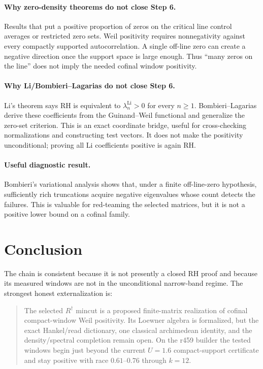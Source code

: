 \documentclass[11pt]{article}
\newcommand{\Rd}{R^{\dagger}}
\begin{document}
\paragraph{Why zero-density theorems do not close Step 6.}
Results that put a positive proportion of zeros on the critical
line control averages or restricted zero sets.  Weil positivity
requires nonnegativity against every compactly supported
autocorrelation.  A single off-line zero can create a negative
direction once the support space is large enough.  Thus
``many zeros on the line'' does not imply the needed cofinal
window positivity.

\paragraph{Why Li/Bombieri--Lagarias do not close Step 6.}
Li's theorem says RH is equivalent to
$\lambda_n^{\mathrm{Li}}>0$ for every $n\ge1$.
Bombieri--Lagarias derive these coefficients from the
Guinand--Weil functional and generalize the zero-set criterion.
This is an exact coordinate bridge, useful for cross-checking
normalizations and constructing test vectors.  It does not make
the positivity unconditional; proving all Li coefficients
positive is again RH.

\paragraph{Useful diagnostic result.}
Bombieri's variational analysis shows that, under a finite
off-line-zero hypothesis, sufficiently rich truncations acquire
negative eigenvalues whose count detects the failures.
This is valuable for red-teaming the selected matrices, but it is
not a positive lower bound on a cofinal family.

\section{Conclusion}

The chain is consistent because it is not presently a closed RH
proof and because its measured windows are not in the
unconditional narrow-band regime.  The strongest honest
externalization is:
\begin{quote}
The selected $\Rd$ mincut is a proposed finite-matrix realization
of cofinal compact-window Weil positivity.  Its Loewner algebra is
formalized, but the exact Hankel/read dictionary, one classical
archimedean identity, and the density/spectral completion remain
open.  On the r459 builder the tested windows begin just beyond
the current $U=1.6$ compact-support certificate and stay positive
with race $0.61$--$0.76$ through $k=12$.
\end{quote}
\end{document}
